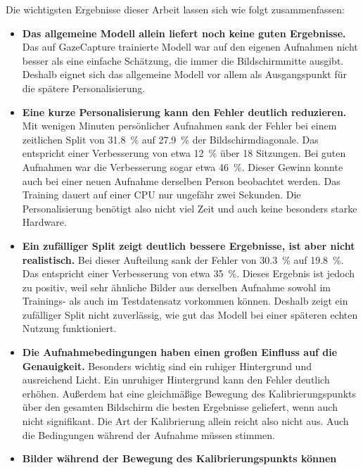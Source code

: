 Die wichtigsten Ergebnisse dieser Arbeit lassen sich wie folgt zusammenfassen:
\begin{itemize}
  \item \textbf{Das allgemeine Modell allein liefert noch keine guten
        Ergebnisse.} Das auf GazeCapture trainierte Modell war auf den eigenen
        Aufnahmen nicht besser als eine einfache Schätzung, die immer die
        Bildschirmmitte ausgibt. Deshalb eignet sich das allgemeine Modell vor
        allem als Ausgangspunkt für die spätere Personalisierung.
  \item \textbf{Eine kurze Personalisierung kann den Fehler deutlich
        reduzieren.} Mit wenigen Minuten persönlicher Aufnahmen sank der Fehler
        bei einem zeitlichen Split von \SI{31,8}{\percent} auf
        \SI{27,9}{\percent} der Bildschirmdiagonale. Das entspricht einer
        Verbesserung von etwa \SI{12}{\percent} über 18 Sitzungen. Bei guten
        Aufnahmen war die Verbesserung sogar etwa \SI{46}{\percent}. Dieser
        Gewinn konnte auch bei einer neuen Aufnahme derselben Person beobachtet
        werden. Das Training dauert auf einer CPU nur ungefähr zwei Sekunden.
        Die Personalisierung benötigt also nicht viel Zeit und auch keine
        besonders starke Hardware.
  \item \textbf{Ein zufälliger Split zeigt deutlich bessere Ergebnisse, ist aber
        nicht realistisch.} Bei dieser Aufteilung sank der Fehler von
        \SI{30,3}{\percent} auf \SI{19,8}{\percent}. Das entspricht einer
        Verbesserung von etwa \SI{35}{\percent}. Dieses Ergebnis ist jedoch zu
        positiv, weil sehr ähnliche Bilder aus derselben Aufnahme sowohl im
        Trainings- als auch im Testdatensatz vorkommen können. Deshalb zeigt ein
        zufälliger Split nicht zuverlässig, wie gut das Modell bei einer
        späteren echten Nutzung funktioniert.
  \item \textbf{Die Aufnahmebedingungen haben einen großen Einfluss auf die
        Genauigkeit.} Besonders wichtig sind ein ruhiger Hintergrund und
        ausreichend Licht. Ein unruhiger Hintergrund kann den Fehler deutlich
        erhöhen. Außerdem hat eine gleichmäßige Bewegung des Kalibrierungspunkts
        über den gesamten Bildschirm die besten Ergebnisse geliefert, wenn auch
        nicht signifikant. Die Art der Kalibrierung allein reicht also nicht
        aus. Auch die Bedingungen während der Aufnahme müssen stimmen.
  \item \textbf{Bilder während der Bewegung des Kalibrierungspunkts können
}
\end{itemize}

